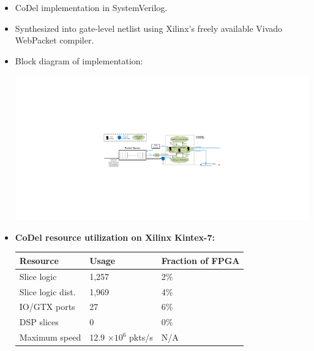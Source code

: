 {\begin{multicols}{2}
\begin{itemize}
\item CoDel implementation in SystemVerilog.
\item Synthesized into gate-level netlist using Xilinx's freely available Vivado WebPacket compiler.
\item Block diagram of implementation:
\\
\begin{center}
\includegraphics[width=\columnwidth]{codel.pdf}
\end{center}
\item \textbf{CoDel resource utilization on Xilinx Kintex-7:}\\
\begin{center}
\begin{tabular}{|l|l|l|}
\hline
\bf Resource & \bf Usage & \bf Fraction of FPGA \\
\hline Slice logic & 1,257 & 2\% \\
\hline Slice logic dist. & 1,969 & 4\% \\
\hline IO/GTX ports & 27 & 6\% \\
\hline DSP slices & 0 & 0\% \\
\hline Maximum speed & 12.9 $\times 10^6$ pkts/s & N/A \\
\hline
\end{tabular}
\end{center}

\end{itemize}


\end{multicols}}
